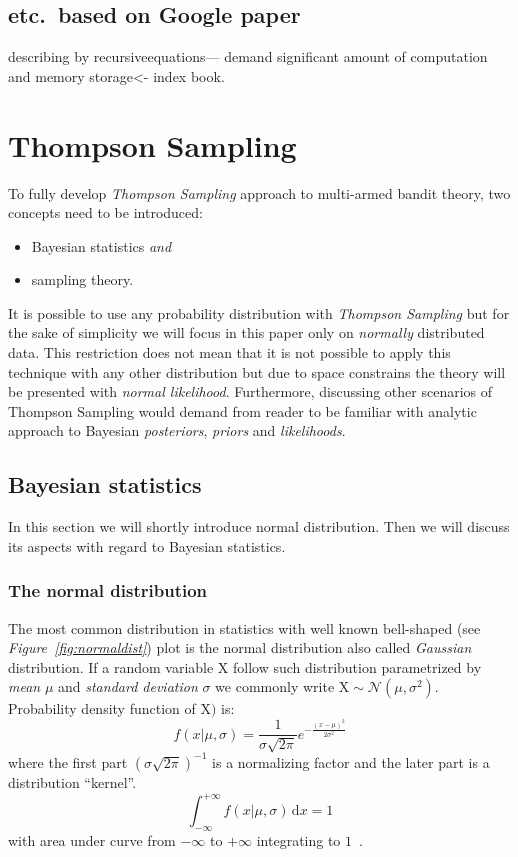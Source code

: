 \documentclass[12pt, a4paper, pdflatex, leqno]{report}
\begin{document}
\subsection{etc.\ based on Google paper}

describing by recursiveequations--- demand significant amount of computation and memory storage<- index book.


\section{Thompson Sampling\label{sec:thompsonsampling}}
To fully develop \emph{Thompson Sampling} approach to multi-armed bandit theory, two concepts need to be introduced:
\begin{itemize}
\item Bayesian statistics \emph{and}
\item sampling theory.
\end{itemize}
It is possible to use any probability distribution with \emph{Thompson Sampling} but for the sake of simplicity we will focus in this paper only on \emph{normally} distributed data. This restriction does not mean that it is not possible to apply this technique with any other distribution but due to space constrains the theory will be presented with \emph{normal likelihood}. Furthermore, discussing other scenarios of Thompson Sampling would demand from reader to be familiar with analytic approach to Bayesian \emph{posteriors}, \emph{priors} and \emph{likelihoods}.

\subsection{Bayesian statistics}
In this section we will shortly introduce normal distribution. Then we will discuss its aspects with regard to Bayesian statistics.

\subsubsection{The normal distribution}
The most common distribution in statistics with well known bell-shaped (see \emph{Figure~\ref{fig:normaldist}}) plot is the normal distribution also called \emph{Gaussian} distribution. If a random variable $\mathrm{X}$ follow such distribution parametrized by \emph{mean} $\mu$ and \emph{standard deviation} $\sigma$ we commonly write $\mathrm{X} \sim \mathcal{N}\left( \mu, \sigma^2 \right)$. Probability density function of $\mathrm{X})$ is:
$$
f \left(x | \mu, \sigma \right) = \frac{1}{\sigma \sqrt{2 \pi }} e^{- \frac{ {\left (  x - \mu \right )}^2 }{2 \sigma^2} }
$$
where the first part ${\left( \sigma \sqrt{2 \pi } \right)}^{-1}$ is a normalizing factor and the later part is a distribution ``kernel''.
$$
\int_{-\infty}^{+\infty} \! f \left(x | \mu, \sigma \right) \, \mathrm{d}x = 1
$$
with area under curve from $-\infty$ to $+\infty$ integrating to $1$~\citep{rice1995mathematical}.
\end{document}
